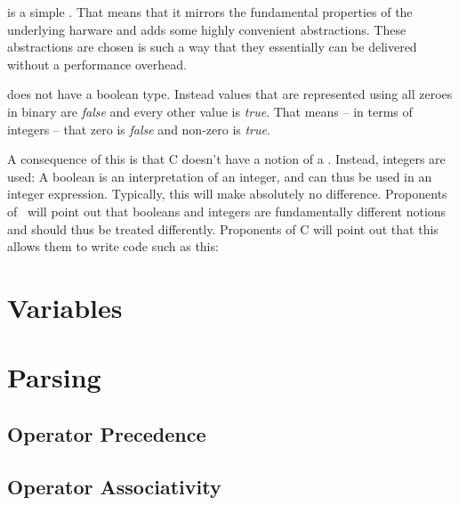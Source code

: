 
\csharpsubsection{\csharp}



 is a simple . That means that it mirrors the fundamental properties of the underlying harware and adds some highly convenient abstractions. These abstractions are chosen is such a way that they essentially can be delivered without a performance overhead.

 does not have a boolean type. Instead  values that are represented using all zeroes in binary are \textsl{false} and every other value is \textsl{true}. That means -- in terms of integers -- that zero is \textsl{false} and non-zero is \textsl{true}. %

A consequence of this is that C doesn't have a notion of a . Instead, integers are used: A boolean is an interpretation of an integer, and can thus be used in an integer expression. Typically, this will make absolutely no difference. Proponents of \csharp\ will point out that booleans and integers are fundamentally different notions and should thus be treated differently. Proponents of C will point out that this allows them to write code such as this:



\section{Variables}
\csharpsubsection{\csharp}

\section{Parsing}
\subsection{Operator Precedence}
\subsection{Operator Associativity}


